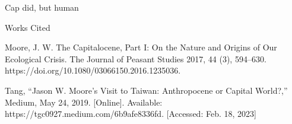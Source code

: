 \documentclass[12pt]{article}
\newcommand{\bibent}{\noindent \hangindent 40pt}
\newenvironment{workscited}{\newpage \begin{center} Works Cited \end{center}}{\newpage }
\begin{document}
\begin{flushleft}
Cap did, but human
\newpage



\begin{workscited}

\bibent Moore, J. W. The Capitalocene, Part I: On the Nature and Origins of Our Ecological Crisis. The Journal of Peasant Studies 2017, 44 (3), 594–630. https://doi.org/10.1080/03066150.2016.1235036.

\bibent 
 Tang, “Jason W. Moore's Visit to Taiwan: Anthropocene or Capital World?,” Medium, May 24, 2019.  [Online]. Available: https://tgc0927.medium.com/6b9afe8336fd. [Accessed: Feb. 18, 2023]




\end{workscited}

\end{flushleft}
\end{document}
